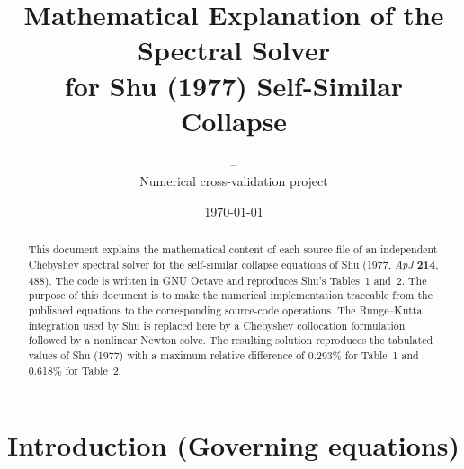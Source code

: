 \documentclass[11pt,a4paper]{article}
\title{\bfseries Mathematical Explanation of the Spectral Solver\\
for Shu (1977) Self-Similar Collapse}
\author{--\\[2pt] Numerical cross-validation project}
\date{\today}
\begin{document}
\maketitle

\begin{abstract}
This document explains the mathematical content of each source file of an
independent Chebyshev spectral solver for the self-similar collapse
equations of Shu (1977, \emph{ApJ} \textbf{214}, 488). The
code is written in GNU Octave and reproduces Shu's Tables~1 and~2. The
purpose of this document is to make the numerical implementation
traceable from the published equations to the corresponding source-code
operations. The Runge--Kutta integration used by Shu is replaced here by
a Chebyshev collocation formulation followed
by a nonlinear Newton solve. The resulting solution
reproduces the tabulated values of Shu (1977) with a maximum relative difference
of 0.293\% for Table~1 and 0.618\% for Table~2.
\end{abstract}

\tableofcontents
\newpage

\section{Introduction (Governing equations)}
\end{document}
